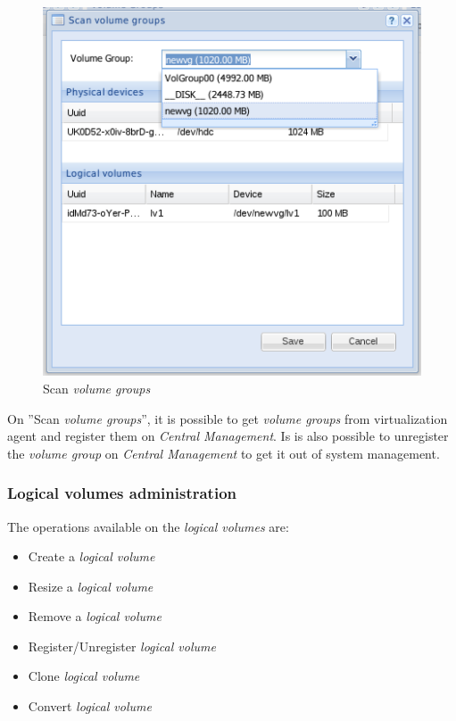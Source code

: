 \begin{figure}[H]
        \begin{center}
        \includegraphics[scale=0.45]{screenshots/node_storage_vg_search.png}
        \caption{Scan \emph{volume groups}}
        \label{fig:storage_vg_search}
        \end{center}
\end{figure}

On ''Scan \emph{volume groups}'', it is possible to get \emph{volume groups} from virtualization agent and register them on \emph{Central Management}.
Is is also possible to unregister the \emph{volume group} on \emph{Central Management} to get it out of system management.


\subsubsection{Logical volumes administration}

The operations available on the \emph{logical volumes} are:
\begin{itemize}
	\item Create a \emph{logical volume}
	\item Resize a \emph{logical volume}
	\item Remove a \emph{logical volume}
	\item Register/Unregister \emph{logical volume}
    \item Clone \emph{logical volume}
    \item Convert \emph{logical volume}
\end{itemize}

